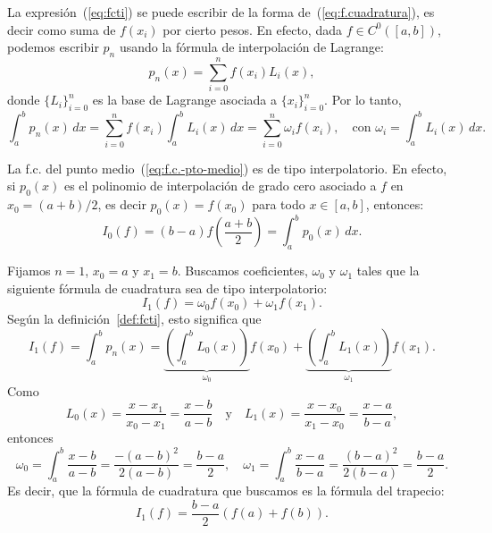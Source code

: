 La expresión~(\ref{eq:fcti}) se puede escribir de la forma
de~(\ref{eq:f.cuadratura}), es decir como suma de $f(x_i)$ por
cierto pesos. En efecto, dada $f\in C^0([a,b])$, podemos escribir
$p_n$ usando la fórmula de interpolación de Lagrange:
\begin{equation*}
  p_n(x)=\sum_{i=0}^n f(x_i) L_i(x),
\end{equation*}
donde $\{L_i\}_{i=0}^n$ es la base de Lagrange asociada a
$\{x_i\}_{i=0}^n$. Por lo tanto,
\begin{equation*}
  \int_a^bp_n(x)\,dx = \sum_{i=0}^n f(x_i) \int_a^b L_i(x)\,dx 
  =\sum_{i=0}^n \omega_i f(x_i), \quad \text{con } \omega_i=\int_a^b L_i(x)\,dx.
\end{equation*}

\begin{example}
  \label{ex:formula-pto-medio-interpol}
  La f.c. del punto medio~(\ref{eq:f.c.-pto-medio}) es de tipo
  interpolatorio. En efecto, si $p_0(x)$ es el polinomio de 
  interpolación de grado cero asociado a $f$ en $x_0=(a+b)/2$, es
  decir $p_0(x)=f(x_0)$ para todo $x\in[a,b]$, entonces:
  \begin{equation*}
    I_0(f) = (b-a)f\left(\frac{a+b}{2}\right) = \int_a^b p_0(x)\,dx.
  \end{equation*}
\end{example}

\begin{example}
  \label{ex:formula-trapecio-interpol}
  Fijamos $n=1$, $x_0=a$ y $x_1=b$. Buscamos coeficientes, $\omega_0$
  y $\omega_1$ tales que la siguiente fórmula de cuadratura sea de
  tipo interpolatorio:
  \begin{equation*}
    I_1(f)=\omega_0 f(x_0) + \omega_1 f(x_1).
  \end{equation*}
  Según la definición~\ref{def:fcti}, esto significa que
  \begin{equation*}
    I_1(f)=\int_a^b p_n(x)= 
    \underbrace{\left(\int_a^bL_0(x)\right)}_{\omega_0} f(x_0)+
    \underbrace{\left(\int_a^bL_1(x)\right)}_{\omega_1} f(x_1).
  \end{equation*}
  Como
  \begin{equation*}
    L_0(x)=\frac{x-x_1}{x_0-x_1}=\frac{x-b}{a-b} \quad \text{y} \quad
    L_1(x)=\frac{x-x_0}{x_1-x_0}=\frac{x-a}{b-a},
  \end{equation*}
  entonces
  \begin{equation*}
    \omega_0 = \int_a^b \frac{x-b}{a-b} = \frac{-(a-b)^2}{2(a-b)}=\frac{b-a}{2},
    \quad
    \omega_1 = \int_a^b \frac{x-a}{b-a} = \frac{(b-a)^2}{2(b-a)}=\frac{b-a}{2}.
  \end{equation*}
  Es decir, que la fórmula de cuadratura que buscamos es la
  fórmula del trapecio:
  \begin{equation*}
    I_1(f)=\frac{b-a}{2}
    \left(
      f(a)+f(b)
    \right).
  \end{equation*}
\end{example}

